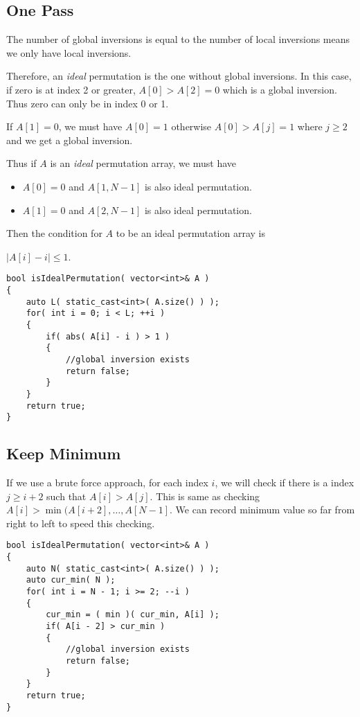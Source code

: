 \subsection{One Pass}
The number of global inversions is equal to the number of local inversions means we only have local inversions.

Therefore, an \textit{ideal} permutation is the one without global inversions. In this case, if zero is at index 2 or greater, $A[0] > A[2] =0$ which is a global inversion. Thus zero can only be in index 0 or 1. 

If $A[1] = 0$, we must have $A[0]=1$ otherwise $A[0] > A[j]=1$ where $j\geq 2$ and we get a global inversion.

Thus if $A$ is an \textit{ideal} permutation array, we must have 

\begin{itemize}
\item $A[0]=0$ and $A[1,N-1]$ is also ideal permutation.
\item $A[1]=0$ and $A[2,N-1]$ is also ideal permutation.
\end{itemize}

Then the condition for $A$ to be an ideal permutation array is 

$\lvert A[i] - i\rvert \leq 1 $.

\setcounter{lstlisting}{0}
\begin{lstlisting}[style=customc, caption={One Pass}]
bool isIdealPermutation( vector<int>& A )
{
    auto L( static_cast<int>( A.size() ) );
    for( int i = 0; i < L; ++i )
    {
        if( abs( A[i] - i ) > 1 )
        {
            //global inversion exists
            return false;
        }
    }
    return true;
}
\end{lstlisting}

\subsection{Keep Minimum}
If we use a brute force approach, for each index $i$, we will check if there is a index $j\geq i+2$ such that $A[i]>A[j]$. This is same as checking $A[i] > \min(A[i+2], \ldots, A[N-1]$. We can record minimum value so far from right to left to speed this checking.

\begin{lstlisting}[style=customc, caption={Keep Minimum}]
bool isIdealPermutation( vector<int>& A )
{
    auto N( static_cast<int>( A.size() ) );
    auto cur_min( N );
    for( int i = N - 1; i >= 2; --i )
    {
        cur_min = ( min )( cur_min, A[i] );
        if( A[i - 2] > cur_min )
        {
            //global inversion exists
            return false;
        }
    }
    return true;
}
\end{lstlisting}